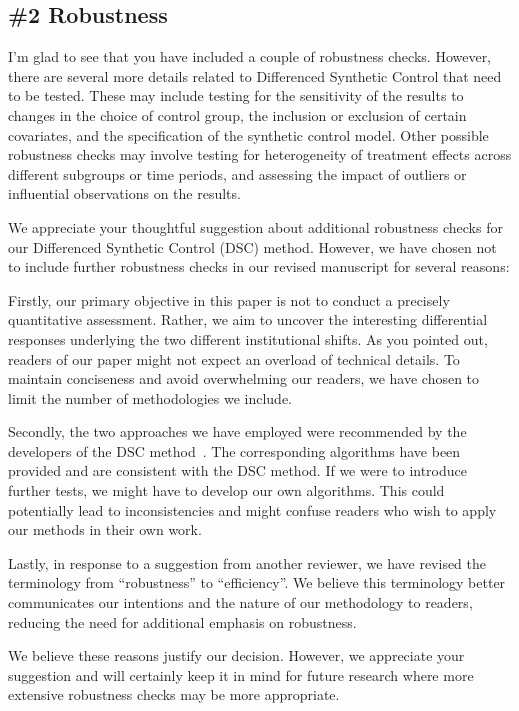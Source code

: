 \subsection{\#2 Robustness}\label{sec:2-2}

\RC{} I'm glad to see that you have included a couple of robustness checks. However, there are several more details related to Differenced Synthetic Control that need to be tested. These may include testing for the sensitivity of the results to changes in the choice of control group, the inclusion or exclusion of certain covariates, and the specification of the synthetic control model. Other possible robustness checks may involve testing for heterogeneity of treatment effects across different subgroups or time periods, and assessing the impact of outliers or influential observations on the results.

\AR{} We appreciate your thoughtful suggestion about additional robustness checks for our Differenced Synthetic Control (DSC) method. However, we have chosen not to include further robustness checks in our revised manuscript for several reasons:

\AR*{} Firstly, our primary objective in this paper is not to conduct a precisely quantitative assessment. Rather, we aim to uncover the interesting differential responses underlying the two different institutional shifts. As you pointed out, readers of our paper might not expect an overload of technical details. To maintain conciseness and avoid overwhelming our readers, we have chosen to limit the number of methodologies we include.

\AR*{} Secondly, the two approaches we have employed were recommended by the developers of the DSC method~\cite{engelbrektson2023}.
The corresponding algorithms have been provided and are consistent with the DSC method. If we were to introduce further tests, we might have to develop our own algorithms. This could potentially lead to inconsistencies and might confuse readers who wish to apply our methods in their own work.

\AR*{} Lastly, in response to a suggestion from another reviewer, we have revised the terminology from ``robustness'' to ``efficiency''. We believe this terminology better communicates our intentions and the nature of our methodology to readers, reducing the need for additional emphasis on robustness.

\AR*{} We believe these reasons justify our decision. However, we appreciate your suggestion and will certainly keep it in mind for future research where more extensive robustness checks may be more appropriate.

